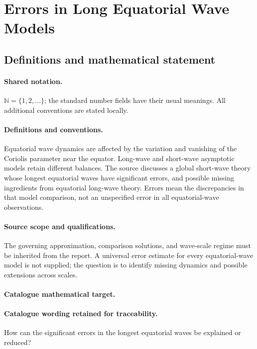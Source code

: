 \documentclass[11pt]{article}
\begin{document}
\section{Errors in Long Equatorial Wave Models}\label{statement}

\subsection{Definitions and mathematical statement}

\paragraph{Shared notation.}$\mathbb N=\{1,2,\ldots\}$; the standard number fields have their usual meanings. All additional conventions are stated locally.


\paragraph{Definitions and conventions.} Equatorial wave dynamics are affected by the variation and vanishing of the Coriolis parameter near the equator. Long-wave and short-wave asymptotic models retain different balances. The source discusses a global short-wave theory whose longest equatorial waves have significant errors, and possible missing ingredients from equatorial long-wave theory. Errors mean the discrepancies in that model comparison, not an unspecified error in all equatorial-wave observations.

\paragraph{Source scope and qualifications.} The governing approximation, comparison solutions, and wave-scale regime must be inherited from the report. A universal error estimate for every equatorial-wave model is not supplied; the question is to identify missing dynamics and possible extensions across scales.

\paragraph{Catalogue mathematical target.}
\paragraph{Catalogue wording retained for traceability.}
How can the significant errors in the longest equatorial waves be explained or reduced?
\end{document}
